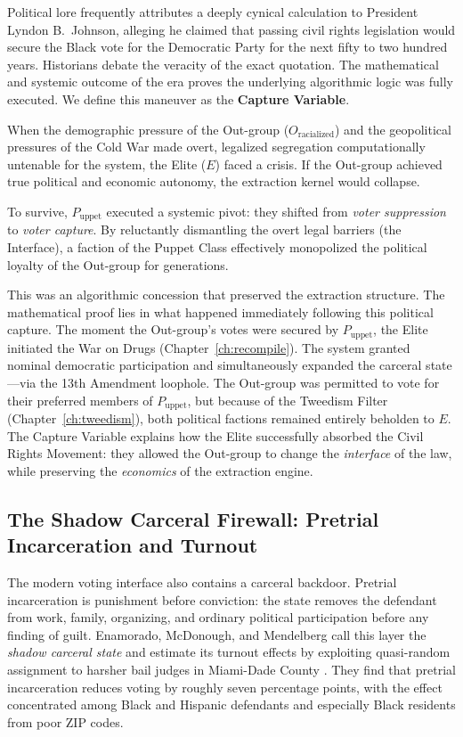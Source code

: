 Political lore frequently attributes a deeply cynical calculation to President Lyndon B.\ Johnson, alleging he claimed that passing civil rights legislation would secure the Black vote for the Democratic Party for the next fifty to two hundred years. Historians debate the veracity of the exact quotation. The mathematical and systemic outcome of the era proves the underlying algorithmic logic was fully executed. We define this maneuver as the \textbf{Capture Variable}.

When the demographic pressure of the Out-group ($O_{\text{racialized}}$) and the geopolitical pressures of the Cold War made overt, legalized segregation computationally untenable for the system, the Elite ($E$) faced a crisis. If the Out-group achieved true political and economic autonomy, the extraction kernel would collapse.

To survive, $P_{\text{uppet}}$ executed a systemic pivot: they shifted from \textit{voter suppression} to \textit{voter capture}. By reluctantly dismantling the overt legal barriers (the Interface), a faction of the Puppet Class effectively monopolized the political loyalty of the Out-group for generations.

This was an algorithmic concession that preserved the extraction structure. The mathematical proof lies in what happened immediately following this political capture. The moment the Out-group's votes were secured by $P_{\text{uppet}}$, the Elite initiated the War on Drugs (Chapter~\ref{ch:recompile}). The system granted nominal democratic participation and simultaneously expanded the carceral state---via the 13th Amendment loophole. The Out-group was permitted to vote for their preferred members of $P_{\text{uppet}}$, but because of the Tweedism Filter (Chapter~\ref{ch:tweedism}), both political factions remained entirely beholden to $E$. The Capture Variable explains how the Elite successfully absorbed the Civil Rights Movement: they allowed the Out-group to change the \textit{interface} of the law, while preserving the \textit{economics} of the extraction engine.

\subsection{The Shadow Carceral Firewall: Pretrial Incarceration and Turnout}

The modern voting interface also contains a carceral backdoor. Pretrial incarceration is punishment before conviction: the state removes the defendant from work, family, organizing, and ordinary political participation before any finding of guilt. Enamorado, McDonough, and Mendelberg call this layer the \textit{shadow carceral state} and estimate its turnout effects by exploiting quasi-random assignment to harsher bail judges in Miami-Dade County \cite{enamorado_shadow_carceral_2024}. They find that pretrial incarceration reduces voting by roughly seven percentage points, with the effect concentrated among Black and Hispanic defendants and especially Black residents from poor ZIP codes.

